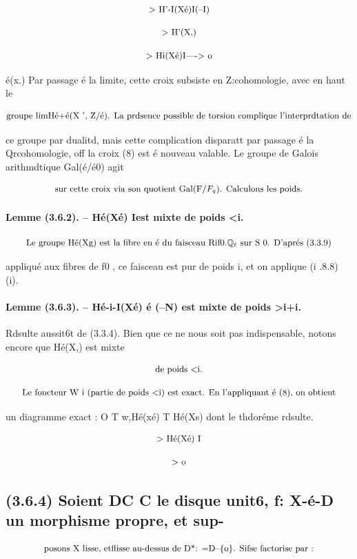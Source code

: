 \documentclass[11pt]{article}
\theoremstyle{remark}
\begin{document}
\[\text{\small > H'-I(Xé)I(--I)}\]

\[\text{\small > H'(X,)}\]

\[\text{\small > Hi(Xé)I----> o}\]

é(x.) Par passage é la limite, cette croix subsiste en Z:cohomologie, avec en haut le

\[\text{\small groupe limHé+é(X ', Z/é). La prdsence possible de torsion complique l'interprdtation de}\]

ce groupe par dualitd, mais cette complication disparatt par passage é la Qrcohomologie, off la croix (8) est é nouveau valable. Le groupe de Galois arithmdtique Gal(é/é0) agit

\[\text{\small sur cette croix via son quotient Gal(F/\(F_q\)). Calculons les poids.}\]

\paragraph{Lemme (3.6.2). -- Hé(Xé) Iest mixte de poids <i.}

\[\text{\small Le groupe Hé(Xg) est la fibre en é du faisceau Rif0.\(\mathbb{Q}_{\ell}\) sur S 0. D'aprés (3.3.9)}\]

appliqué aux fibres de f0 , ce faisceau est pur de poids i, et on applique (i .8.8) (i).

\paragraph{Lemme (3.6.3). -- Hé-i-I(Xé) é (--N) est mixte de poids >i+i.}

Rdsulte aussit6t de (3.3.4). Bien que ce ne nous soit pas indispensable, notons encore que Hé(X,) est mixte

\[\text{\small de poids <i.}\]

\[\text{\small Le foncteur W i (partie de poids <i) est exact. En l'appliquant é (8), on obtient}\]

un diagramme exact : O T w,Hé(xé) T Hé(Xs) dont le thdoréme rdsulte.

\[\text{\small > Hé(Xé) I}\]

\[\text{\small > o}\]

\subsection*{(3.6.4) Soient DC C le disque unit6, f: X-é-D un morphisme propre, et sup-}

\[\text{\small posons X lisse, etflisse au-dessus de D*: =D--\{o\}. Sifse factorise par :}\]
\end{document}
